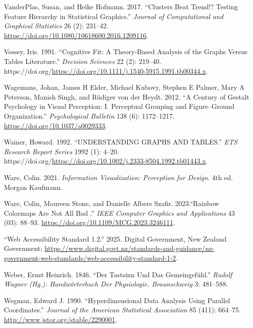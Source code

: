 \documentclass[
  letterpaper,
  DIV=11,
  numbers=noendperiod]{scrreprt}
\newlength{\cslhangindent}
\newenvironment{CSLReferences}[2] %
 {\begin{list}{}{%
  \setlength{\itemindent}{0pt}
  \setlength{\leftmargin}{0pt}
  \setlength{\parsep}{0pt}
  \ifodd #1
   \setlength{\leftmargin}{\cslhangindent}
   \setlength{\itemindent}{-1\cslhangindent}
  \fi
  \setlength{\itemsep}{#2\baselineskip}}}
 {\end{list}}
\begin{document}
\begin{CSLReferences}{1}{0}
VanderPlas, Susan, and Heike Hofmann. 2017. {``Clusters Beat Trend!?
Testing Feature Hierarchy in Statistical Graphics.''} \emph{Journal of
Computational and Graphical Statistics} 26 (2): 231--42.
\url{https://doi.org/10.1080/10618600.2016.1209116}.

Vessey, Iris. 1991. {``Cognitive Fit: A Theory-Based Analysis of the
Graphs Versus Tables Literature.''} \emph{Decision Sciences} 22 (2):
219--40.
https://doi.org/\url{https://doi.org/10.1111/j.1540-5915.1991.tb00344.x}.

Wagemans, Johan, James H Elder, Michael Kubovy, Stephen E Palmer, Mary A
Peterson, Manish Singh, and Rüdiger von der Heydt. 2012. {``A Century of
Gestalt Psychology in Visual Perception: I. Perceptual Grouping and
Figure--Ground Organization.''} \emph{Psychological Bulletin} 138 (6):
1172--1217. \url{https://doi.org/10.1037/a0029333}.

Wainer, Howard. 1992. {``UNDERSTANDING GRAPHS AND TABLES.''} \emph{ETS
Research Report Series} 1992 (1): 4--20.
https://doi.org/\url{https://doi.org/10.1002/j.2333-8504.1992.tb01443.x}.

Ware, Colin. 2021. \emph{Information Visualization: Perception for
Design}. 4th ed. Morgan Kaufmann.

Ware, Colin, Maureen Stone, and Danielle Albers Szafir. 2023.{``{Rainbow
Colormaps Are Not All Bad }.''} \emph{IEEE Computer Graphics and
Applications} 43 (03): 88--93.
\url{https://doi.org/10.1109/MCG.2023.3246111}.

{``Web Accessibility Standard 1.2.''} 2025. Digital Government, New
Zealand Government;
\url{https://www.digital.govt.nz/standards-and-guidance/nz-government-web-standards/web-accessibility-standard-1-2}.

Weber, Ernst Heinrich. 1846. {``Der Tastsinn Und Das Gemeingef{ü}hl.''}
\emph{Rudolf Wagner (Hg.): Handw{ö}rterbuch Der Physiologie.
Braunschweig} 3: 481--588.

Wegman, Edward J. 1990. {``Hyperdimensional Data Analysis Using Parallel
Coordinates.''} \emph{Journal of the American Statistical Association}
85 (411): 664--75. \url{http://www.jstor.org/stable/2290001}.


\end{CSLReferences}
\end{document}
